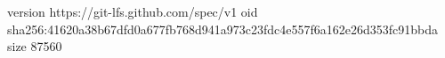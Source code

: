 version https://git-lfs.github.com/spec/v1
oid sha256:41620a38b67dfd0a677fb768d941a973c23fdc4e557f6a162e26d353fc91bbda
size 87560
